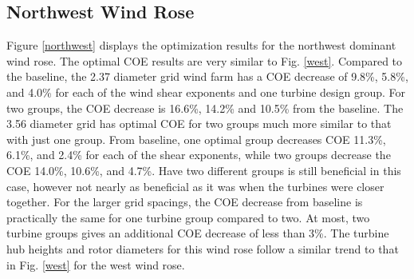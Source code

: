 \documentclass[conf]{new-aiaa}
\begin{document}
   \subsection{Northwest Wind Rose}
   Figure \ref{northwest} displays the optimization results for the northwest dominant wind rose. The optimal COE results are very similar to Fig. \ref{west}. 
   Compared to the baseline, the 2.37 diameter grid wind farm has a COE decrease of 9.8\%, 5.8\%, and 4.0\% for each of the wind shear exponents and one turbine design group. For two groups, the COE decrease is 16.6\%, 14.2\% and 10.5\% from the baseline. 
   The 3.56 diameter grid has optimal COE for two groups much more similar to that with just one group. From baseline, one optimal group decreases COE 11.3\%, 6.1\%, and 2.4\% for each of the shear exponents, while two groups decrease the COE 14.0\%, 10.6\%, and 4.7\%. Have two different groups is still beneficial in this case, however not nearly as beneficial as it was when the turbines were closer together. 
   For the larger grid spacings, the COE decrease from baseline is practically the same for one turbine group compared to two. At most, two turbine groups gives an additional COE decrease of less than 3\%. 
   The turbine hub heights and rotor diameters for this wind rose follow a similar trend to that in Fig. \ref{west} for the west wind rose. 
  
   
   
   
   
\end{document}
